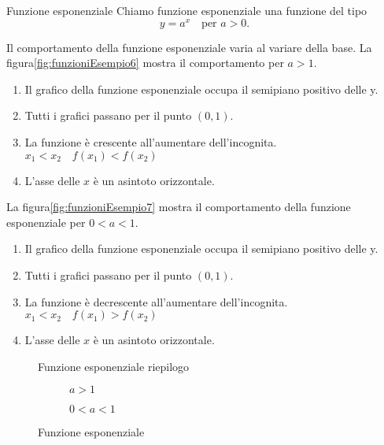 \begin{definizionet}{Funzione esponenziale}{}
	Chiamo funzione esponenziale una funzione del tipo \[y=a^x\quad
	\text{per $a>0$.} \]
\end{definizionet}
Il comportamento della funzione esponenziale varia al variare della base. La figura\nobs\vref{fig:funzioniEsempio6} mostra il comportamento per $a>1$.
\begin{enumerate}
\item Il grafico della funzione esponenziale occupa il semipiano positivo delle y.
\item Tutti i grafici passano per il punto $(0,1)$.
\item La funzione è crescente all'aumentare dell'incognita. $x_1<x_2\quad f(x_1)<f(x_2)$ 
\item L'asse delle $x$ è un asintoto orizzontale.
\end{enumerate}
 La figura\nobs\vref{fig:funzioniEsempio7} mostra il comportamento della funzione esponenziale per $0<a<1$. 
 \begin{enumerate}
 \item Il grafico della funzione esponenziale occupa il semipiano positivo delle y.
 \item Tutti i grafici passano per il punto $(0,1)$.
 \item La funzione è  decrescente all'aumentare dell'incognita. $x_1<x_2\quad f(x_1)>f(x_2)$ 
 \item L'asse delle $x$ è un asintoto orizzontale.
 \end{enumerate}
\begin{figure}
\centering
\caption{Funzione esponenziale riepilogo}
\label{fig:FunzioneExp}
\end{figure}
\begin{figure}
	\centering
	\begin{subfigure}[b]{.4\linewidth}
		\centering
		
		\caption{$a>1$}
		\label{fig:funzioniEsempio6}
	\end{subfigure}\qquad
	\centering
	\begin{subfigure}[b]{.4\linewidth}
		\centering
		
		\caption{$0<a<1$}
		\label{fig:funzioniEsempio7}
	\end{subfigure}%
		\caption{Funzione esponenziale}
		\label{fig:funzExp2}
\end{figure}
